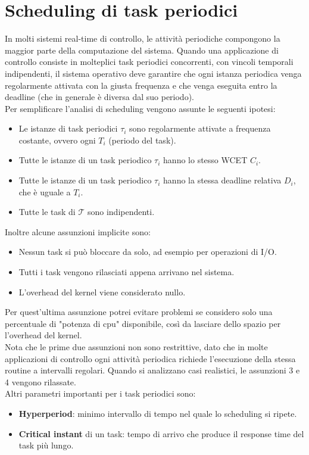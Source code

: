 \documentclass[12pt]{article}
\begin{document}
\section{Scheduling di task periodici}
In molti sistemi real-time di controllo, le attività periodiche compongono la maggior parte della computazione del sistema.
Quando una applicazione di controllo consiste in molteplici task periodici concorrenti, con vincoli temporali indipendenti, il sistema operativo deve garantire che ogni istanza periodica 
venga regolarmente attivata con la giusta frequenza e che venga eseguita entro la deadline (che in generale è diversa dal suo periodo).\\
Per semplificare l'analisi di scheduling vengono assunte le seguenti ipotesi:
\begin{itemize}
    \item Le istanze di task periodici $\tau_i$ sono regolarmente attivate a frequenza costante, ovvero ogni $T_i$ (periodo del task).
    \item Tutte le istanze di un task periodico $\tau_i$ hanno lo stesso WCET $C_i$.
    \item Tutte le istanze di un task periodico $\tau_i$ hanno la stessa deadline relativa $D_i$, che è uguale a $T_i$.
    \item Tutte le task di $\mathcal{T}$ sono indipendenti.
\end{itemize}
Inoltre alcune assunzioni implicite sono:
\begin{itemize}
    \item Nessun task si può bloccare da solo, ad esempio per operazioni di I/O.
    \item Tutti i task vengono rilasciati appena arrivano nel sistema.
    \item L'overhead del kernel viene considerato nullo.
\end{itemize}
Per quest'ultima assunzione potrei evitare problemi se considero solo una percentuale di "potenza di cpu" disponibile, così da lasciare dello spazio per l'overhead del kernel.\\
Nota che le prime due assunzioni non sono restrittive, dato che in molte applicazioni di controllo ogni attività periodica richiede l'esecuzione della stessa routine a intervalli regolari.
Quando si analizzano casi realistici, le assunzioni 3 e 4 vengono rilassate.
\\
Altri parametri importanti per i task periodici sono:
\begin{itemize}
    \item \textbf{Hyperperiod}: minimo intervallo di tempo nel quale lo scheduling si ripete.
    \item \textbf{Critical instant} di un task: tempo di arrivo che produce il response time del task più lungo.
\end{itemize}
\end{document}
